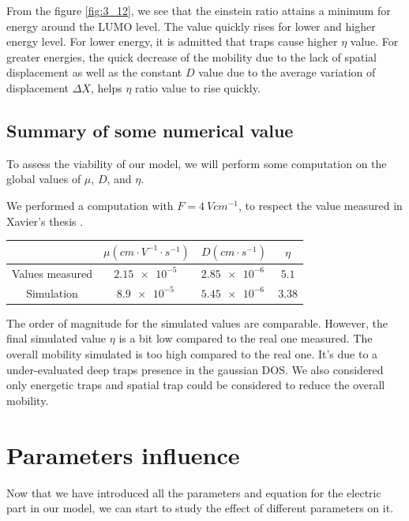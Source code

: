 From the figure \ref{fig:3_12}, we see that the einstein ratio attains a minimum for energy around the LUMO level. The value quickly rises for lower and higher energy level. For lower energy, it is admitted that traps cause higher $\eta$ value. For greater energies, the quick decrease of the mobility due to the lack of spatial displacement as well as the constant $D$ value due to the average variation of displacement $\Delta X$, helps $\eta$ ratio value to rise quickly.

\subsection{Summary of some numerical value}

To assess the viability of our model, we will perform some computation on the global values of $\mu$, $D$, and $\eta$.

We performed a computation with $F = \SI{4}{V cm^{-1}}$, to respect the value measured in Xavier's thesis \cite{xavier_thesis}.

\begin{center}
    \begin{tabular}{ |c||c|c|c|  }
        \hline
        & $\mu (\si{cm \cdot V^{-1} \cdot s^{-1}})$ & $D (\si{cm \cdot s^{-1}})$ & $\eta$ \\
        \hline
        \hline
        Values measured & $\SI{2.15e-5}{}$ & $\SI{2.85e-6}{}$ & $5.1$ \\
        \hline
        Simulation & $\SI{8.9e-5}{}$ & $\SI{5.45e-6}{}$ & $3.38$ \\
        \hline
    \end{tabular}
\end{center}

The order of magnitude for the simulated values are comparable. However, the final simulated value $\eta$ is a bit low compared to the real one measured. The overall mobility simulated is too high compared to the real one. It's due to a under-evaluated deep traps presence in the gaussian DOS. We also considered only energetic traps and spatial trap could be considered to reduce the overall mobility.

\section{Parameters influence}

Now that we have introduced all the parameters and equation for the electric part in our model, we can start to study the effect of different parameters on it.

